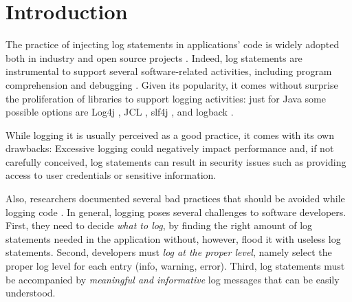 \section{Introduction} \label{sec:intro}



The practice of injecting log statements in applications' code is widely adopted both in industry and open source projects \cite{oliner2012advances}. Indeed, log statements are instrumental to support several software-related activities, including program comprehension and debugging \cite{lu2017log,gurumdimma2016crude}. Given its popularity, it comes without surprise the proliferation of libraries to support logging activities: just for Java some possible options are Log4j \cite{log4j}, JCL \cite{jcl}, slf4j \cite{slf4j}, and logback \cite{logback}.

While logging it is usually perceived as a good practice, it comes with its own drawbacks: Excessive logging could negatively impact performance and, if not carefully conceived, log statements can result in security issues such as providing access to user credentials or sensitive information. 

Also, researchers documented several bad practices that should be avoided while logging code \cite{Chen:icse2017,Li:icse2019}. 
In general, logging poses several challenges to software developers. First, they need to decide \emph{what to log}, by finding the right amount of log statements needed in the application without, however, flood it with useless log statements. Second, developers must \emph{log at the proper level}, namely select the proper log level for each entry (\eg info, warning, error). Third, log statements must be accompanied by \emph{meaningful and informative} log messages that can be easily understood. 

